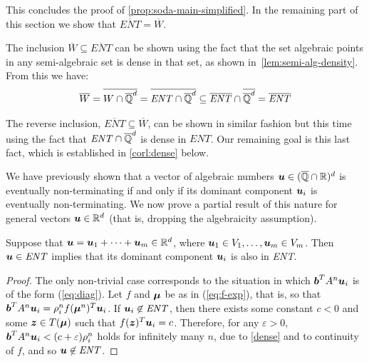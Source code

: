 This concludes the proof of \cref{prop:soda-main-simplified}.
In the remaining part of this section we show that
$\overline{\mathit{ENT}}=\overline{W}$.

The inclusion $\overline{W}\subseteq \overline{ENT}$ can be shown
using the fact that the set algebraic points in any semi-algebraic set
is dense in that set, as shown in~\cref{lem:semi-alg-density}.  From
this we have:
\begin{align*}
\overline{W}=\overline{W\cap\overline{\mathbb{Q}}^{d}}=\overline{\mathit{ENT}\cap\overline{\mathbb{Q}}^{d}} \subseteq \overline{\mathit{ENT}}\cap\overline{\overline{\mathbb{Q}}^{d}}=\overline{\mathit{ENT}}
\end{align*}

The reverse inclusion, $\overline{ENT}\subseteq\overline{W}$, can be
shown in similar fashion but this time using the fact that
$\mathit{ENT}\cap\overline{\mathbb{Q}}^{d}$ is dense in $\mathit{ENT}$.  Our
remaining goal is this last fact, which is established in
\cref{corl:dense} below.

We have previously shown that a vector of algebraic numbers $\boldsymbol{u}\in (\overline{\mathbb{Q}}\cap\mathbb{R})^{d}$ is eventually non-terminating if and only if its dominant component $\boldsymbol{u}_i$ is eventually non-terminating. We now prove a partial result of this nature for general vectors $\boldsymbol{u} \in \mathbb{R}^{d}$ (that is, dropping the algebraicity assumption).

\begin{proposition}
  Suppose that $\boldsymbol u=\boldsymbol u_1+\cdots+\boldsymbol
  u_m\in \mathbb{R}^{d}$, where $\boldsymbol u_1\in
  V_1,\ldots,\boldsymbol u_m\in V_m$. Then $\boldsymbol
  u\in\mathit{ENT}$ implies that its dominant component $\boldsymbol
  u_i$ is also in \textit{ENT}.
\label{prop:dom2}
\end{proposition}
\begin{proof}
  The only non-trivial case corresponds to the situation in which
  $\boldsymbol b^T A^n \boldsymbol u_i$ is of the form (\ref{eq:diag}).
  Let $f$ and $\boldsymbol \mu$ be as in (\ref{eq:f-exp}), that is, so
  that $\boldsymbol b^T A^n \boldsymbol u_i=\rho_i^n f (\boldsymbol
  \mu^n)^T \boldsymbol u_i$. If $\boldsymbol u_i\not\in\mathit{ENT}$,
  then there exists some constant $c<0$ and some $\boldsymbol z\in T(\boldsymbol \mu)$ such that $f(\boldsymbol z)^T \boldsymbol u_i=c$. Therefore, for any $\varepsilon>0$, $\boldsymbol b^T A^n \boldsymbol u_i<(c+\varepsilon)\rho_i^n$ holds for infinitely many $n$, due to \cref{dense} and to continuity of $f$, and so $\boldsymbol u\not\in\mathit{ENT}$.
\end{proof}

